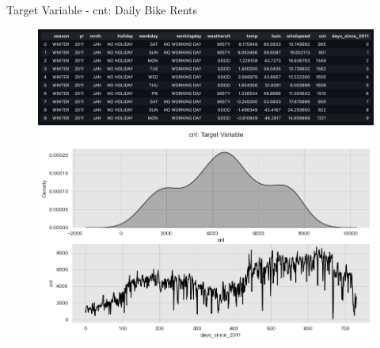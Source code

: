 \documentclass[10pt]{beamer}
\begin{document}
\begin{frame}{Target Variable -  cnt: Daily Bike Rents}
\begin{center}
  \begin{figure}
    \includegraphics[scale=0.28]{images/head.png} 
    \includegraphics[scale=0.4]{images/interpretable_ml_10_0.png}
  \end{figure}
\end{center}
\end{frame}
\end{document}
